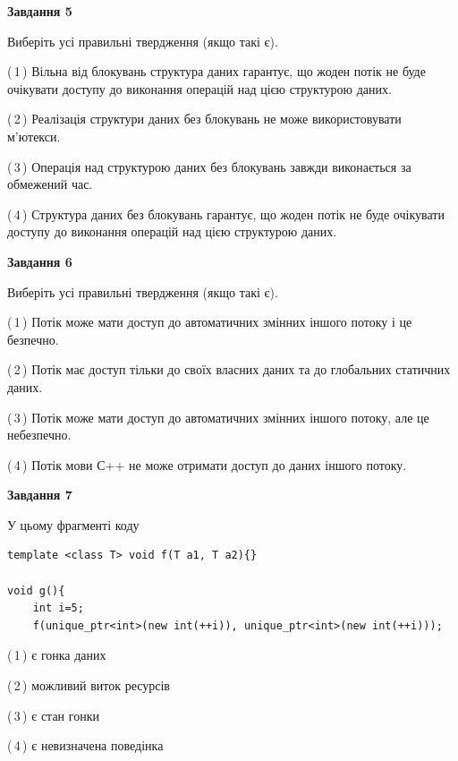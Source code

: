 \documentclass[12pt, ukrainian]{article}
\begin{document}
\begin {large}
{\begin{center}
\textbf{Завдання 5}
\end{center}

Виберіть усі правильні твердження (якщо такі є).\par
\vspace{2mm}

(\,1\,) Вільна від блокувань структура даних гарантує, що жоден потік не буде очікувати доступу до виконання операцій над цією структурою даних.%

(\,2\,) Реалізація структури даних без блокувань не може використовувати м’ютекси.%

(\,3\,) Операція над структурою даних без блокувань завжди виконається за обмежений час.%

(\,4\,) Структура даних без блокувань гарантує, що жоден потік не буде очікувати доступу до виконання операцій над цією структурою даних.%
\newpage


\begin{center}
\textbf{Завдання 6}
\end{center}

Виберіть усі правильні твердження (якщо такі є).\par
\vspace{2mm}

(\,1\,) Потік може мати доступ до автоматичних змінних іншого потоку і це безпечно.%

(\,2\,) Потік має доступ тільки до своїх власних даних та до глобальних статичних даних.%

(\,3\,) Потік може мати доступ до автоматичних змінних іншого потоку, але це небезпечно.%

(\,4\,) Потік мови С++ не може отримати доступ до даних іншого потоку.%


\begin{center}
\textbf{Завдання 7}
\end{center}

У цьому фрагменті коду
\begin{verbatim}
template <class T> void f(T a1, T a2){}

void g(){
    int i=5;
    f(unique_ptr<int>(new int(++i)), unique_ptr<int>(new int(++i)));
\end{verbatim}

(\,1\,) є гонка даних%

(\,2\,) можливий виток ресурсів%

(\,3\,) є стан гонки%

(\,4\,) є невизначена поведінка%

}
\end {large}

\vspace{4mm}
\newpage
\end{document}
